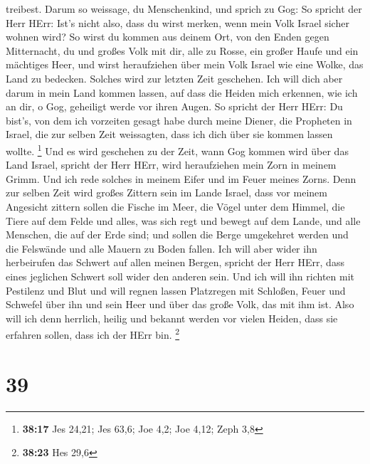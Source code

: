 treibest.  Darum so weissage, du Menschenkind, und sprich
zu Gog: So spricht der Herr HErr: Ist's nicht also, dass du wirst
merken, wenn mein Volk Israel sicher wohnen wird?  So wirst
du kommen aus deinem Ort, von den Enden gegen Mitternacht, du und großes
Volk mit dir, alle zu Rosse, ein großer Haufe und ein mächtiges Heer,
 und wirst heraufziehen über mein Volk Israel wie eine
Wolke, das Land zu bedecken. Solches wird zur letzten Zeit geschehen.
Ich will dich aber darum in mein Land kommen lassen, auf dass die Heiden
mich erkennen, wie ich an dir, o Gog, geheiligt werde vor ihren Augen.
 So spricht der Herr HErr: Du bist's, von dem ich vorzeiten
gesagt habe durch meine Diener, die Propheten in Israel, die zur selben
Zeit weissagten, dass ich dich über sie kommen lassen wollte.
\footnote{\textbf{38:17} Jes 24,21; Jes 63,6; Joe 4,2; Joe 4,12; Zeph
  3,8}  Und es wird geschehen zu der Zeit, wann Gog kommen
wird über das Land Israel, spricht der Herr HErr, wird heraufziehen mein
Zorn in meinem Grimm.  Und ich rede solches in meinem Eifer
und im Feuer meines Zorns. Denn zur selben Zeit wird großes Zittern sein
im Lande Israel,  dass vor meinem Angesicht zittern sollen
die Fische im Meer, die Vögel unter dem Himmel, die Tiere auf dem Felde
und alles, was sich regt und bewegt auf dem Lande, und alle Menschen,
die auf der Erde sind; und sollen die Berge umgekehret werden und die
Felswände und alle Mauern zu Boden fallen.  Ich will aber
wider ihn herbeirufen das Schwert auf allen meinen Bergen, spricht der
Herr HErr, dass eines jeglichen Schwert soll wider den anderen sein.
 Und ich will ihn richten mit Pestilenz und Blut und will
regnen lassen Platzregen mit Schloßen, Feuer und Schwefel über ihn und
sein Heer und über das große Volk, das mit ihm ist.  Also
will ich denn herrlich, heilig und bekannt werden vor vielen Heiden,
dass sie erfahren sollen, dass ich der HErr bin. \footnote{\textbf{38:23}
  Hes 29,6}

\hypertarget{section-12}{%
\section{39}\label{section-12}}


